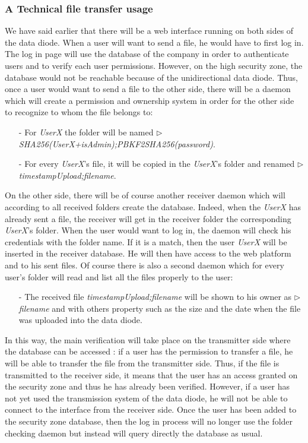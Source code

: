 \documentclass[a4paper,10pt]{article}
\begin{document}
\subsubsection{A Technical file transfer usage}
We have said earlier that there will be a web interface running on both sides of the data diode. When a user will want to send a file, he would have to first log in. The log in page will use the database of the company in order to authenticate users and to verify each user permissions. However, on the high security zone, the database would not be reachable because of the unidirectional data diode. Thus, once a user would want to send a file to the other side, there will be a daemon which will create a permission and ownership system in order for the other side to recognize to whom the file belongs to:
\begin{enumerate}
\item[-]For \emph{UserX} the folder will be named $\triangleright$ \emph{SHA256(UserX+isAdmin);PBKF2SHA256(password)}.
\item[-]For every \emph{UserX}'s file, it will be copied in the \emph{UserX}'s folder and renamed $\triangleright$ \emph{timestampUpload;filename}.
\end{enumerate}
 
On the other side, there will be of course another receiver daemon which will according to all received folders create the database. Indeed, when the \emph{UserX} has already sent a file, the receiver will get in the receiver folder the corresponding \emph{UserX}'s folder. When the user would want to log in, the daemon will check his credentials with the folder name. If it is a match, then the user \emph{UserX} will be inserted in the receiver database. He will then have access to the web platform and to his sent files. Of course there is also a second daemon which for every user's folder will read and list all the files properly to the user:

\begin{enumerate}

\item[-] The received file \emph{timestampUpload;filename} will be shown to his owner as $\triangleright$ \emph{filename} and with others property such as the size and the date when the file was uploaded into the data diode.
\end{enumerate}

In this way, the main verification will take place on the transmitter side where the database can be accessed : if a user has the permission to transfer a file, he will be able to transfer the file from the transmitter side. Thus, if the file is transmitted to the receiver side, it means that the user has an access granted on the security zone and thus he has already been verified. However, if a user has not yet used the transmission system of the data diode, he will not be able to connect to the interface from the receiver side. Once the user has been added to the security zone database, then the log in process will no longer use the folder checking daemon but instead will query directly the database as usual.
\end{document}
